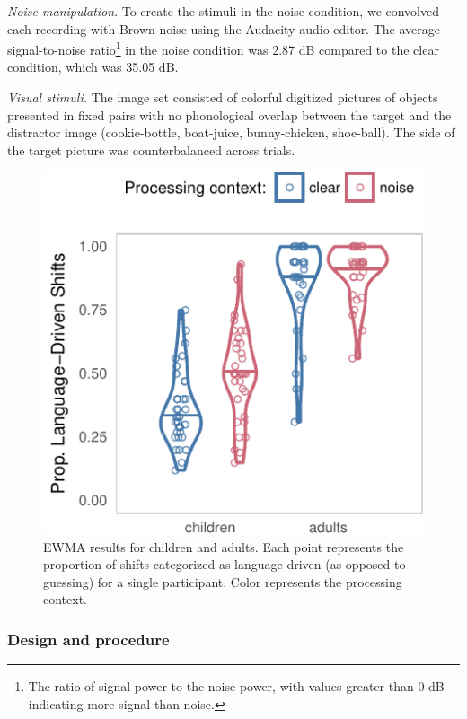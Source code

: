 \documentclass[10pt, letterpaper]{article}
\newenvironment{CodeChunk}{}{}
\begin{document}
\emph{Noise manipulation}. To create the stimuli in the noise condition,
we convolved each recording with Brown noise using the Audacity audio
editor. The average signal-to-noise ratio\footnote{The ratio of signal
  power to the noise power, with values greater than 0 dB indicating
  more signal than noise.} in the noise condition was 2.87 dB compared
to the clear condition, which was 35.05 dB.

\emph{Visual stimuli.} The image set consisted of colorful digitized
pictures of objects presented in fixed pairs with no phonological
overlap between the target and the distractor image (cookie-bottle,
boat-juice, bunny-chicken, shoe-ball). The side of the target picture
was counterbalanced across trials.

\begin{CodeChunk}
\begin{figure}[t]

{\centering \includegraphics[width=0.75\linewidth]{figs/ewma_violin_plot-1} 

}

\caption[EWMA results for children and adults]{EWMA results for children and adults. Each point represents the proportion of shifts categorized as language-driven (as opposed to guessing) for a single participant. Color represents the processing context.}\label{fig:ewma_violin_plot}
\end{figure}
\end{CodeChunk}

\subsubsection{Design and procedure}\label{design-and-procedure}
\end{document}
